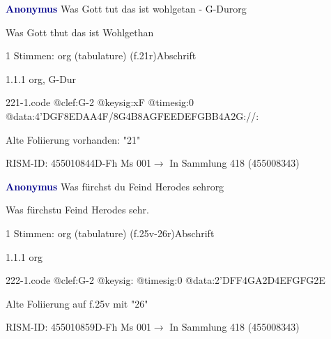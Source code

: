 \documentclass[twocolumn]{book}
\begin{document}
\par \vspace{7pt} \textcolor{darkblue}{\textbf{Anonymus  }}\hfillplus{\textbf{[221]}}\newline Was Gott tut das ist wohlgetan - G-Dur\newline org
\par \begin{itshape} Was Gott thut das ist Wohlgethan\end{itshape} 
\par \textcolor{darkblue}{}  1 Stimmen: org (tabulature)  (f.21r)\newline Abschrift
\par 1.1.1  org, G-Dur  
\begin{filecontents*}{221-1.code}
@clef:G-2
@keysig:xF
@timesig:0
@data:4'DGF{8ED}{AA}4F/8G4B8A{GFEE}{DEFG}{BB}4A2G://:
\end{filecontents*}
\newline
%
\par Alte Foliierung vorhanden: "21"
\par RISM-ID: 455010844\newline D-Fh  Ms 001\newline $\rightarrow$ In Sammlung 418 (455008343)
      
\par \vspace{7pt} \textcolor{darkblue}{\textbf{Anonymus  }}\hfillplus{\textbf{[222]}}\newline Was fürchst du Feind Herodes sehr\newline org
\par \begin{itshape}[f.25v, at left:] Was fürchstu Feind Herodes sehr.\end{itshape} 
\par \textcolor{darkblue}{}  1 Stimmen: org (tabulature)  (f.25v-26r)\newline Abschrift
\par 1.1.1  org  
\begin{filecontents*}{222-1.code}
@clef:G-2
@keysig:
@timesig:0
@data:2'DFF4GA2D4EFGFG2E
\end{filecontents*}
\newline
%
\par Alte Foliierung auf f.25v mit "26"
\par RISM-ID: 455010859\newline D-Fh  Ms 001\newline $\rightarrow$ In Sammlung 418 (455008343)
      
\end{document}
